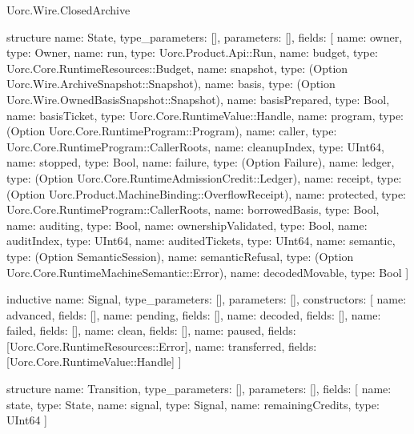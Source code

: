 \begin{lexlean}{Uorc.Wire.ClosedArchive}
\begin{semanticmodule}
structure{
  name: State,
  type_parameters: [],
  parameters: [],
  fields: [
    {name: owner, type: Owner},
    {name: run, type: Uorc.Product.Api::Run},
    {name: budget, type: Uorc.Core.RuntimeResources::Budget},
    {name: snapshot, type: (Option Uorc.Wire.ArchiveSnapshot::Snapshot)},
    {name: basis, type: (Option Uorc.Wire.OwnedBasisSnapshot::Snapshot)},
    {name: basisPrepared, type: Bool},
    {name: basisTicket, type: Uorc.Core.RuntimeValue::Handle},
    {name: program, type: (Option Uorc.Core.RuntimeProgram::Program)},
    {name: caller, type: Uorc.Core.RuntimeProgram::CallerRoots},
    {name: cleanupIndex, type: UInt64},
    {name: stopped, type: Bool},
    {name: failure, type: (Option Failure)},
    {name: ledger, type: (Option Uorc.Core.RuntimeAdmissionCredit::Ledger)},
    {name: receipt, type: (Option Uorc.Product.MachineBinding::OverflowReceipt)},
    {name: protected, type: Uorc.Core.RuntimeProgram::CallerRoots},
    {name: borrowedBasis, type: Bool},
    {name: auditing, type: Bool},
    {name: ownershipValidated, type: Bool},
    {name: auditIndex, type: UInt64},
    {name: auditedTickets, type: UInt64},
    {name: semantic, type: (Option SemanticSession)},
    {name: semanticRefusal, type: (Option Uorc.Core.RuntimeMachineSemantic::Error)},
    {name: decodedMovable, type: Bool}
  ]
}

inductive{
  name: Signal,
  type_parameters: [],
  parameters: [],
  constructors: [
    {name: advanced, fields: []},
    {name: pending, fields: []},
    {name: decoded, fields: []},
    {name: failed, fields: []},
    {name: clean, fields: []},
    {name: paused, fields: [Uorc.Core.RuntimeResources::Error]},
    {name: transferred, fields: [Uorc.Core.RuntimeValue::Handle]}
  ]
}

structure{
  name: Transition,
  type_parameters: [],
  parameters: [],
  fields: [
    {name: state, type: State},
    {name: signal, type: Signal},
    {name: remainingCredits, type: UInt64}
  ]
}


\end{semanticmodule}
\end{lexlean}
